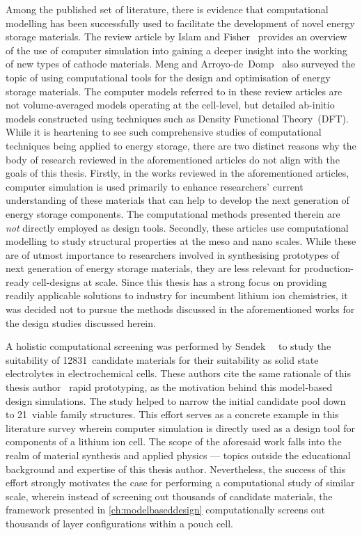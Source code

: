 Among  the published  set of  literature, there  is evidence  that computational
modelling  has  been   successfully  used  to  facilitate   the  development  of
novel   energy   storage   materials.   The  review   article   by   Islam   and
Fisher~\cite{Islam2014} provides an  overview of the use  of computer simulation
into  gaining  a  deeper insight  into  the  working  of  new types  of  cathode
materials. Meng  and Arroyo-de~Domp~\cite{Meng2009}  also surveyed the  topic of
using  computational tools  for the  design and  optimisation of  energy storage
materials. The  computer models  referred to  in these  review articles  are not
volume-averaged  models  operating at  the  cell-level,  but detailed  ab-initio
models  constructed using  techniques such  as Density  Functional Theory~(DFT).
While  it is  heartening  to  see such  comprehensive  studies of  computational
techniques being applied  to energy storage, there are two  distinct reasons why
the body of  research reviewed in the aforementioned articles  do not align with
the goals of  this thesis. Firstly, in the works  reviewed in the aforementioned
articles, computer simulation is used  primarily to enhance researchers' current
understanding of these materials that can help to develop the next generation of
energy  storage  components. The  computational  methods  presented therein  are
\emph{not}  directly employed  as  design tools.  Secondly,  these articles  use
computational  modelling to  study structural  properties at  the meso  and nano
scales.  While  these  are  of  utmost importance  to  researchers  involved  in
synthesising prototypes of next generation of energy storage materials, they are
less relevant for production-ready cell-designs  at scale. Since this thesis has
a  strong  focus on  providing  readily  applicable  solutions to  industry  for
incumbent lithium  ion chemistries,  it was  decided not  to pursue  the methods
discussed in the aforementioned works for the design studies discussed herein.

A      holistic      computational      screening     was      performed      by
Sendek~\etal~\cite{Sendek2017}  to  study  the  suitability  of  12831~candidate
materials for their  suitability as solid state  electrolytes in electrochemical
cells. These  authors cite the  same rationale  of this thesis  author \ie~rapid
prototyping, as the  motivation behind this model-based  design simulations. The
study  helped to  narrow the  initial candidate  pool down  to 21~viable  family
structures. This effort  serves as a concrete example in  this literature survey
wherein computer simulation is directly used  as a design tool for components of
a lithium  ion cell. The  scope of  the aforesaid work  falls into the  realm of
material  synthesis  and applied  physics  ---  topics outside  the  educational
background and  expertise of  this thesis author.  Nevertheless, the  success of
this effort  strongly motivates  the case for  performing a  computational study
of  similar scale,  wherein  instead  of screening  out  thousands of  candidate
materials, the framework presented in \cref{ch:modelbaseddesign} computationally
screens out thousands of layer configurations within a pouch cell.

